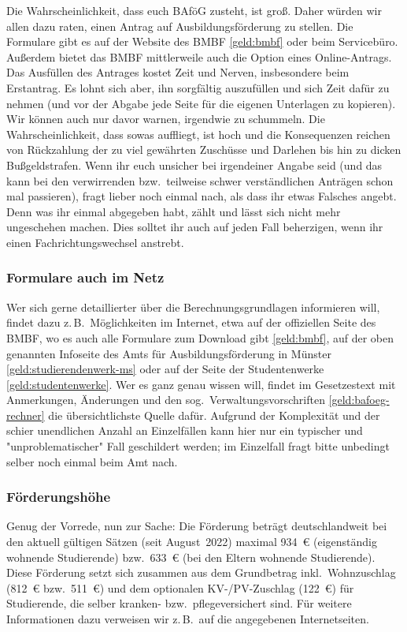 \begin{multicols}{2}
Die Wahrscheinlichkeit, dass euch BAföG zusteht, ist groß.
Daher würden wir allen dazu raten, einen Antrag auf Ausbildungsförderung zu stellen.
Die Formulare gibt es auf der Website des BMBF \cref{geld:bmbf} oder beim Servicebüro. Außerdem bietet das BMBF mittlerweile auch die Option eines Online-Antrags.
Das Ausfüllen des Antrages kostet Zeit und Nerven, insbesondere beim Erstantrag.
Es lohnt sich aber, ihn sorgfältig auszufüllen und sich Zeit dafür zu nehmen (und vor der Abgabe jede Seite für die eigenen Unterlagen zu kopieren).
Wir können auch nur davor warnen, irgendwie zu schummeln.
Die Wahrscheinlichkeit, dass sowas auffliegt, ist hoch und die Konsequenzen reichen von Rückzahlung der zu viel gewährten Zuschüsse und Darlehen bis hin zu dicken Bußgeldstrafen.
Wenn ihr euch unsicher bei irgendeiner Angabe seid (und das kann bei den verwirrenden bzw.\ teilweise schwer verständlichen Anträgen schon mal passieren), fragt lieber noch einmal nach, als dass ihr etwas Falsches angebt.
Denn was ihr einmal abgegeben habt, zählt und lässt sich nicht mehr ungeschehen machen.
Dies solltet ihr auch auf jeden Fall beherzigen, wenn ihr einen Fachrichtungswechsel anstrebt.

\subsubsection{Formulare auch im Netz}
Wer sich gerne detaillierter über die Berechnungsgrundlagen informieren will, findet dazu z.\,B.\ Möglichkeiten im Internet, etwa auf der offiziellen Seite des BMBF, wo es auch alle Formulare zum Download gibt \cref{geld:bmbf}, auf der oben genannten Infoseite des Amts für Ausbildungsförderung in Münster \cref{geld:studierendenwerk-ms} oder auf der Seite der Studentenwerke \cref{geld:studentenwerke}.
Wer es ganz genau wissen will, findet im Gesetzestext mit Anmerkungen, Änderungen und den sog.\ Verwaltungsvorschriften \cref{geld:bafoeg-rechner} die übersichtlichste Quelle dafür.
Aufgrund der Komplexität und der schier unendlichen Anzahl an Einzelfällen kann hier nur ein typischer und "unproblematischer" Fall geschildert werden; im Einzelfall fragt bitte unbedingt selber noch einmal beim Amt nach.

\subsubsection{Förderungshöhe}
Genug der Vorrede, nun zur Sache: Die Förderung beträgt deutschlandweit bei den aktuell gültigen Sätzen (seit August~2022) maximal \SI{934}{\euro} (eigenständig wohnende Studierende) bzw.\ \SI{633}{\euro} (bei den Eltern wohnende Studierende).
Diese Förderung setzt sich zusammen aus dem Grundbetrag inkl.\ Wohnzuschlag (\SI{812}{\euro} bzw.\ \SI{511}{\euro}) und dem optionalen KV-/PV-Zuschlag (\SI{122}{\euro}) für Studierende, die selber kranken- bzw.\ pflegeversichert sind.
Für weitere Informationen dazu verweisen wir z.\,B.\ auf die angegebenen Internetseiten.


\end{multicols}
